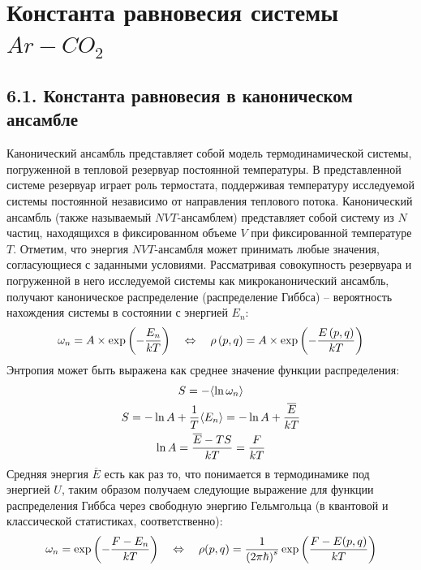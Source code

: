 \section{Константа равновесия системы $Ar-CO_2$}

\subsection*{\protect \textbf{6.1.} Константа равновесия в каноническом ансамбле \cite{keszei, landau2}}

Канонический ансамбль представляет собой модель термодинамической системы, погруженной в тепловой резервуар постоянной температуры. В представленной системе резервуар играет роль термостата, поддерживая температуру исследуемой системы постоянной независимо от направления теплового потока. Канонический ансамбль (также называемый $NVT$-ансамблем) представляет собой систему из $N$ частиц, находящихся в фиксированном объеме $V$ при фиксированной температуре $T$. Отметим, что энергия $NVT$-ансамбля может принимать любые значения, согласующиеся с заданными условиями. Рассматривая совокупность резервуара и погруженной в него исследуемой системы как микроканонический ансамбль, получают каноническое распределение (распределение Гиббса) -- вероятность нахождения системы в состоянии с энергией $E_n$:
\vverh
\begin{gather}
	\omega_n = A \times \exp \left( - \frac{E_n}{kT} \right) \quad \Leftrightarrow \quad \rho \left( p, q \right) = A \times \exp \left( - \frac{E \left( p, q \right)}{kT} \right) \notag
\end{gather}
Энтропия может быть выражена как среднее значение функции распределения:
\vverh
\begin{gather}
	S = - \langle \ln \omega_n \rangle \notag \\
	S = - \ln A + \frac{1}{T} \langle E_n \rangle = - \ln A + \frac{\overline{E}}{kT} \notag \\
	\ln A = \frac{\overline{E} - TS}{kT} = \frac{F}{kT} \notag 
\end{gather}
Средняя энергия $\overline{E}$ есть как раз то, что понимается в термодинамике под энергией $U$, таким образом получаем следующие выражение для функции распределения Гиббса через свободную энергию Гельмгольца (в квантовой и классической статистиках, соответственно):
\vverh
\begin{gather}
	\omega_n = \exp \left( - \frac{F - E_n}{kT} \right) \quad \Leftrightarrow \quad \rho(p, q) = \frac{1}{\left( 2 \pi \hbar \right)^{s}} \exp \left( \frac{F - E(p, q)}{kT} \right) \notag
\end{gather}

